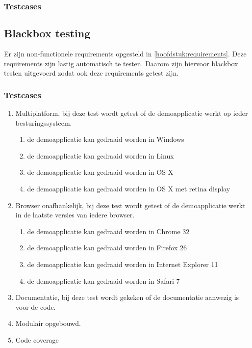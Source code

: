 \subsubsection{Testcases}



\subsection{Blackbox testing}
Er zijn non-functionele requirements opgesteld in \autoref{hoofdstuk:requirements}. Deze requirements zijn lastig automatisch te testen. Daarom zijn hiervoor blackbox testen uitgevoerd zodat ook deze requirements getest zijn.

\subsubsection{Testcases}
\begin{enumerate}[label={T\arabic*}]
	\setcounter{enumi}{\value{startvaluetest}}
	\item Multiplatform, bij deze test wordt getest of de demoapplicatie werkt op ieder besturingssysteem.
    \begin{enumerate}[label={T\arabic{enumi}.\arabic*}]
    	\item de demoapplicatie kan gedraaid worden in Windows
    	\item de demoapplicatie kan gedraaid worden in Linux
    	\item de demoapplicatie kan gedraaid worden in OS X
    	\item de demoapplicatie kan gedraaid worden in OS X met retina display
    \end{enumerate}
	\item Browser onafhankelijk, bij deze test wordt getest of de demoapplicatie werkt in de laatste versies van iedere browser.
    \begin{enumerate}[label={T\arabic{enumi}.\arabic*}]
    	\item de demoapplicatie kan gedraaid worden in Chrome 32
    	\item de demoapplicatie kan gedraaid worden in Firefox 26
    	\item de demoapplicatie kan gedraaid worden in Internet Explorer 11 
    	\item de demoapplicatie kan gedraaid worden in Safari 7 
    \end{enumerate}
	\item Documentatie, bij deze test wordt gekeken of de documentatie aanwezig is voor de code. 
	\item Modulair opgebouwd. 
	\item Code coverage 
\end{enumerate}


